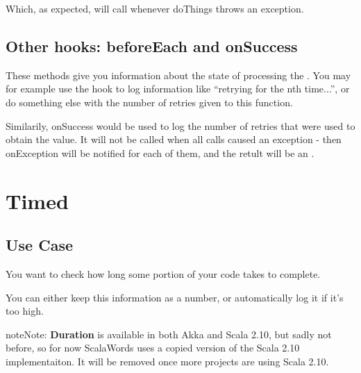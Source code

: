 \documentclass[a4paper,10pt,oneside,openany]{sphinxmanual}
\begin{document}
Which, as expected, will call   whenever doThings throws an exception.


\subsection{Other hooks: beforeEach and onSuccess}
\label{verbs/repeat:other-hooks-beforeeach-and-onsuccess}
These methods give you information about the state of processing the .
You may for example use the  hook to log information like ``retrying for the nth time...'',
or do something else with the number of retries given to this function.

Similarily, onSuccess would be used to log the number of retries that were used to obtain the value.
It will not be called when all calls caused an exception - then onException will be notified for each of them, and the retult will be an .


\section{Timed}
\label{verbs/timed:timed}\label{verbs/timed::doc}

\subsection{Use Case}
\label{verbs/timed:use-case}
You want to check how long some portion of your code takes to complete.

You can either keep this information as a number, or automatically log it if it's too high.

\begin{notice}{note}{Note:}
\textbf{Duration} is available in both Akka and Scala 2.10, but sadly not before, so for now ScalaWords uses a copied version of the Scala 2.10 implementaiton. It will be removed once more projects are using Scala 2.10.
\end{notice}
\end{document}
